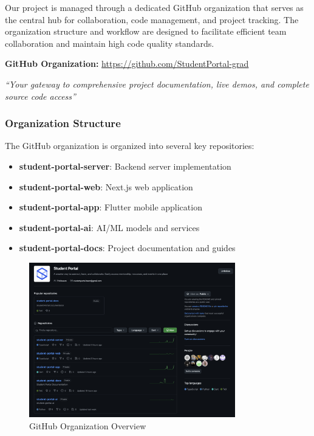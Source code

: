 Our project is managed through a dedicated GitHub organization that serves as the central hub for collaboration, code management, and project tracking. The organization structure and workflow are designed to facilitate efficient team collaboration and maintain high code quality standards.

\begin{tcolorbox}[title=\textbf{🔗 Complete Project Access}, colback=blue!10!white, colframe=blue!70!black]
    \centering
    \textbf{ GitHub Organization:} \url{https://github.com/StudentPortal-grad}
    
    \vspace{0.5em}
    \textit{``Your gateway to comprehensive project documentation, live demos, and complete source code access''}
    \end{tcolorbox}

\subsubsection{Organization Structure}
\label{subsubsec:org_structure}

The GitHub organization is organized into several key repositories:

\begin{itemize}
    \item \textbf{student-portal-server}: Backend server implementation
    \item \textbf{student-portal-web}: Next.js web application
    \item \textbf{student-portal-app}: Flutter mobile application
    \item \textbf{student-portal-ai}: AI/ML models and services
    \item \textbf{student-portal-docs}: Project documentation and guides
\end{itemize}

\begin{figure}[h]
    \centering
    \includegraphics[width=0.8\textwidth]{images/github-org-overview}
    \caption{GitHub Organization Overview}
    \label{fig:github_org}
\end{figure}

